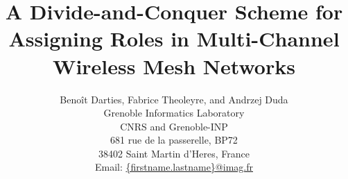\documentclass[twoside]{article}
\begin{document}
\newcommand{\ieee}{{\sc ieee} 802.11\xspace}
\newcommand{\lp}{{\sc lp}\xspace}
\newcommand{\milp}{{\sc milp}\xspace}
\newcommand{\wsnet}{WsNet\xspace}
\newcommand{\rwcds}{r-WCDS\xspace}
\newcommand{\potatoes}{\texttt{potatoes}\xspace}

\newcommand{\T}{\mathcal{T}}
\newcommand{\CT}{\mathcal{CT}}
\newcommand{\leader}{\mathcal{L}eader}
\newcommand{\cluster}{\mathcal{C}luster}
\newcommand{\rootleader}{\mathcal{R}oot\mathcal{L}eader}
\newcommand{\clusterleader}{\mathcal{C}luster\mathcal{L}eader}
\newcommand{\rootcluster}{\mathcal{R}oot\mathcal{C}luster}

\newcommand{\parent}{\mathcal{P}arent}
\newcommand{\children}{\mathcal{C}hildren}
\newcommand{\clusterLinks}{\mathcal{C}luster\mathcal{L}inks}
\newcommand{\clusterRoles}{\mathcal{C}luster\mathcal{R}oles}

\newcommand{\rootleaderdistance}{\mathcal{R}oot\mathcal{L}eader\mathcal{D}istance}
\newcommand{\leaderDistance}{\mathcal{L}eader\mathcal{D}istance}


\newcommand{\V}{\mathcal{V}}
\newcommand{\E}{\mathcal{E}}
\newcommand{\G}{\mathcal{G}}
\newcommand{\W}{\mathcal{W}}
\newcommand{\capa}{BW}
\newcommand{\NbCh}{nbCH}  
\newcommand{\ch}{CH}  
\newcommand{\Traffic}{T}   
\newcommand{\TrafficMin}{T_{min}}   
\newcommand{\role}{role}   


\title{A Divide-and-Conquer Scheme for Assigning Roles in Multi-Channel Wireless Mesh Networks}
\author{
Beno\^it Darties, Fabrice Theoleyre, and Andrzej Duda
\vspace{0.4cm}\\
{\small Grenoble Informatics Laboratory}
\\
{\small CNRS and Grenoble-INP}
\\
{\small 681 rue de la passerelle, BP72}
\\
{\small 38402 Saint Martin d'Heres, France}
\\
{\small Email: \url{{firstname.lastname}@imag.fr}}
}

\date{}

\maketitle
\end{document}
